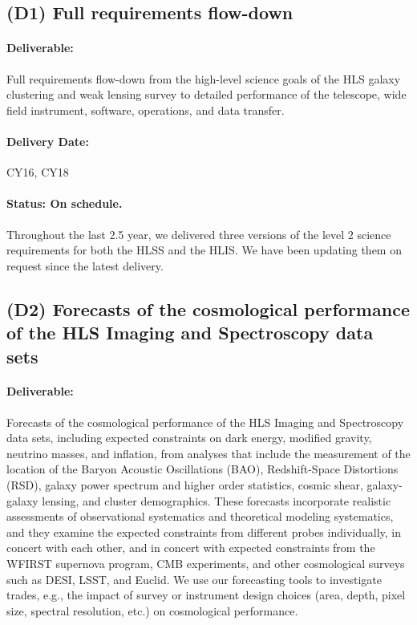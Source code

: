 \subsection*{(D1) Full requirements flow-down}

\paragraph*{Deliverable:} Full requirements flow-down from the high-level science goals of the HLS galaxy clustering and weak lensing survey to detailed performance of the telescope, wide field instrument, software, operations, and data transfer.

\paragraph*{Delivery Date:} CY16, CY18

\paragraph*{Status: On schedule.} Throughout the last 2.5 year, we delivered three versions of the level 2 science requirements for both the HLSS and the HLIS. We have been updating them on request since the latest delivery.

\subsection*{(D2) Forecasts of the cosmological performance of the HLS Imaging
and Spectroscopy data sets}

\paragraph*{Deliverable:} Forecasts of the cosmological performance of the HLS Imaging
and Spectroscopy data sets, including expected constraints on dark energy,
modified gravity, neutrino masses, and inflation, from analyses that include the
measurement of the location of the Baryon Acoustic Oscillations (BAO),
Redshift-Space Distortions (RSD), galaxy power spectrum and higher order
statistics, cosmic shear, galaxy-galaxy lensing, and cluster demographics. These
forecasts incorporate realistic assessments of observational systematics and
theoretical modeling systematics, and they examine the expected constraints from
different probes individually, in concert with each other, and in concert with
expected constraints from the WFIRST supernova program, CMB experiments, and
other cosmological surveys such as DESI, LSST, and Euclid. We use our
forecasting tools to investigate trades, e.g., the impact of survey or
instrument design choices (area, depth, pixel size, spectral resolution, etc.)
on cosmological performance.

